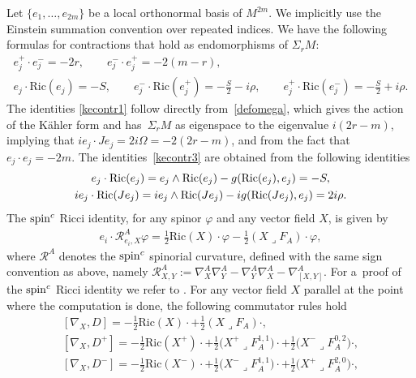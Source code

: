 \documentclass[10pt,a4paper]{amsart}
\numberwithin{equation}{section}
\theoremstyle{definition}
\begin{document}
Let $\{e_1,\dots, e_{2m}\}$ be  a local orthonormal basis of $M^{2m}$. We implicitly use the Einstein summation convention over repeated indices. We have the  following formulas for contractions that
hold as endomorphisms of $\Sigma_r M$:
\begin{gather}\label{kecontr1}
e_j^+\cdot e_j^-=-2r, \qquad e_j^-\cdot e_j^+=-2(m-r),
\\
\label{kecontr3}
e_j\cdot \mathrm{Ric}(e_j)=-S, \qquad e_j^-\cdot \mathrm{Ric}(e_j^+)=-\frac{S}{2}-i\rho, \qquad e_j^+\cdot \mathrm{Ric}(e_j^-)=-\frac{S}{2}+i\rho.
\end{gather}
The  identities \eqref{kecontr1} follow directly from~\eqref{defomega}, which gives the action of the K\"ahler form and has~$\Sigma_r M $ as eigenspace to the eigenvalue $i(2r-m)$, implying that $ie_j\cdot Je_j=2i\Omega=-2(2r-m)$, and from the fact that $e_j\cdot e_j=-2m$. The identities~\eqref{kecontr3} are obtained from the following identities
\begin{gather*}
e_j\cdot {\mathop{\rm Ric}}(e_j)=e_j\wedge {\mathop{\rm Ric}}(e_j)-g({\mathop{\rm Ric}}(e_j),e_j)=-S,\\
 ie_j\cdot {\mathop{\rm Ric}}(Je_j)=ie_j\wedge {\mathop{\rm Ric}}(Je_j)-ig({\mathop{\rm Ric}}(Je_j),e_j)=2i\rho.
\end{gather*}
The ${\mathop{\rm spin}^c}$ Ricci identity, for any spinor $\varphi$ and any vector f\/ield $X$, is given by
\begin{gather}\label{ricident}
e_i \cdot\mathcal{R}^A_{e_i,X} \varphi= \frac{1}{2}\mathrm{Ric}(X) \cdot\varphi-\frac{1}{2} (X\lrcorner F_A)\cdot\varphi,
\end{gather}
where $\mathcal{R}^A$ denotes the ${\mathop{\rm spin}^c}$ spinorial curvature, def\/ined with the same sign convention as above, namely $\mathcal{R}^A_{X,Y}:=\nabla^A_{X}\nabla^A_{Y}
-\nabla^A_{Y}\nabla^A_{X}-\nabla^A_{[X,Y]}$. For a~proof of the ${\mathop{\rm spin}^c}$ Ricci identity we refer to \cite[Section~3.1]{fr_book}.
For any vector f\/ield $X$ parallel at the point where the computation is done, the following commutator rules hold
 \begin{gather}\label{nablax}
[\nabla_X,D]=-\frac{1}{2}\mathrm{Ric}(X)\cdot+\frac{1}{2}(X\lrcorner F_A)\cdot,
\\\label{nablax+}
[\nabla_{X},D^+]=-\frac{1}{2}\mathrm{Ric}(X^+)\cdot+\frac{1}{2}\big(X^+\lrcorner F^{1,1}_A\big)\cdot +\frac{1}{2}\big(X^-\lrcorner F_A^{0,2}\big)\cdot,
\\
\label{nablax-}
[\nabla_{X},D^-]=-\frac{1}{2}\mathrm{Ric}(X^-)\cdot+\frac{1}{2}\big(X^-\lrcorner F^{1,1}_A\big)\cdot+\frac{1}{2}\big(X^+\lrcorner F_A^{2,0}\big)\cdot,
\end{gather}
\end{document}
